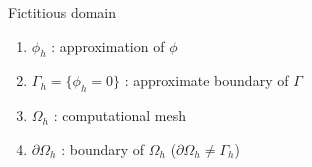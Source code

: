 \begin{frame}{Fictitious domain}

    \vspace{10pt}
    
    \begin{center}
        \begin{minipage}{0.43\linewidth}
            \centering
        \end{minipage} \hfill
        \begin{minipage}{0.1\linewidth}
            \centering
        \end{minipage} \hfill
        \begin{minipage}{0.43\linewidth}
            \centering
        \end{minipage}
    \end{center}

    \begin{enumerate}[\ding{217}]
        \item $\phi_h$ : approximation of $\phi$ \\ 
        \item $\Gamma_h=\{\phi_h=0\}$ : approximate boundary of $\Gamma$
        \item $\Omega_h$ : computational mesh
        \item $\partial\Omega_h$ : boundary of $\Omega_h$ ($\partial\Omega_h \ne \Gamma_h$)
    \end{enumerate}	
    

\end{frame}
